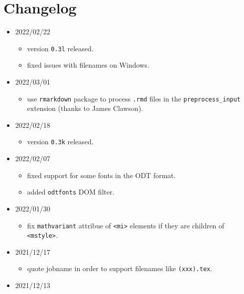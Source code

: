 \hypertarget{changelog}{%
\section{Changelog}\label{changelog}}

\begin{itemize}
\item
  2022/02/22

  \begin{itemize}
  \tightlist
  \item
    version \texttt{0.3l} released.
  \item
    fixed issues with filenames on Windows.
  \end{itemize}
\item
  2022/03/01

  \begin{itemize}
  \tightlist
  \item
    use \texttt{rmarkdown} package to process \texttt{.rmd} files in the
    \texttt{preprocess\_input} extension (thanks to James Clawson).
  \end{itemize}
\item
  2022/02/18

  \begin{itemize}
  \tightlist
  \item
    version \texttt{0.3k} released.
  \end{itemize}
\item
  2022/02/07

  \begin{itemize}
  \tightlist
  \item
    fixed support for some fonts in the ODT format.
  \item
    added \texttt{odtfonts} DOM filter.
  \end{itemize}
\item
  2022/01/30

  \begin{itemize}
  \tightlist
  \item
    fix \texttt{mathvariant} attribue of
    \texttt{\textless{}mi\textgreater{}} elements if they are children
    of \texttt{\textless{}mstyle\textgreater{}}.
  \end{itemize}
\item
  2021/12/17

  \begin{itemize}
  \tightlist
  \item
    quote jobname in order to support filenames like \texttt{(xxx).tex}.
  \end{itemize}
\item
  2021/12/13


\end{itemize}
